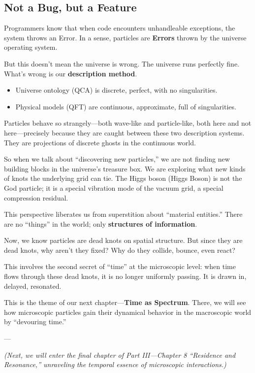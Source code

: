 \subsection{Not a Bug, but a Feature}

Programmers know that when code encounters unhandleable exceptions, the system throws an Error. In a sense, particles are \textbf{Errors} thrown by the universe operating system.

But this doesn't mean the universe is wrong. The universe runs perfectly fine. What's wrong is our \textbf{description method}.

\begin{itemize}
\item Universe ontology (QCA) is discrete, perfect, with no singularities.

\item Physical models (QFT) are continuous, approximate, full of singularities.
\end{itemize}

Particles behave so strangely---both wave-like and particle-like, both here and not here---precisely because they are caught between these two description systems. They are projections of discrete ghosts in the continuous world.

So when we talk about ``discovering new particles,'' we are not finding new building blocks in the universe's treasure box. We are exploring what new kinds of knots the underlying grid can tie. The Higgs boson (Higgs Boson) is not the God particle; it is a special vibration mode of the vacuum grid, a special compression residual.

This perspective liberates us from superstition about ``material entities.'' There are no ``things'' in the world; only \textbf{structures of information}.

Now, we know particles are dead knots on spatial structure. But since they are dead knots, why aren't they fixed? Why do they collide, bounce, even react?

This involves the second secret of ``time'' at the microscopic level: when time flows through these dead knots, it is no longer uniformly passing. It is drawn in, delayed, resonated.

This is the theme of our next chapter---\textbf{Time as Spectrum}. There, we will see how microscopic particles gain their dynamical behavior in the macroscopic world by ``devouring time.''

---

\textit{(Next, we will enter the final chapter of Part III---Chapter 8 ``Residence and Resonance,'' unraveling the temporal essence of microscopic interactions.)}

